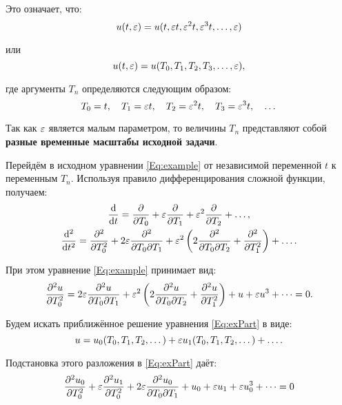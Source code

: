 Это означает, что:
\begin{equation*}
    u(t, \varepsilon) = u(t, \varepsilon t, \varepsilon^2 t, \varepsilon^3 t, \dots, \varepsilon) 
\end{equation*}

или
\begin{equation*}
    u(t, \varepsilon) = u(T_0, T_1, T_2, T_3, \dots, \varepsilon),
\end{equation*}

где аргументы $T_n$ определяются следующим образом:
\begin{equation*}
    T_0 = t, \quad T_1 = \varepsilon t, \quad T_2 = \varepsilon^2 t,
    \quad T_3 = \varepsilon^3 t, \quad \dots
\end{equation*}

Так как $\varepsilon$ является малым параметром,
то величины $T_n$ представляют собой
\textbf{разные временные масштабы исходной задачи}.

Перейдём в исходном уравнении \eqref{Eq:example}
от независимой переменной $t$ к переменным $T_n$.
Используя правило дифференцирования сложной функции, получаем:
\begin{equation*}
    \begin{gathered}
        \dv{}{t} = \pdv{}{T_0} + \varepsilon \pdv{}{T_1} +
        \varepsilon^2 \pdv{}{T_2} + \dots, \\
        \dv[2]{}{t} = \pdv[2]{}{T_0} +
        2 \varepsilon \pdv{}{T_0}{T_1} +
        \varepsilon^2 \left( 2 \pdv{}{T_0}{T_2} + \pdv[2]{T_1}\right) + \dots. 
    \end{gathered}
\end{equation*}

При этом уравнение \eqref{Eq:example} принимает вид:
\begin{equation} \label{Eq:exPart}
    \pdv[2]{u}{T_0} = 2 \varepsilon \pdv{u}{T_0}{T_1} +
    \varepsilon^2 \left( 2 \pdv{u}{T_0}{T_2} + \pdv[2]{u}{T_1} \right) +
    u + \varepsilon u^3 + \dots = 0.
\end{equation}

Будем искать приближённое решение уравнения \eqref{Eq:exPart} в виде:
\begin{equation} \label{Eq:insertDecomp}
    u = u_0(T_0, T_1, T_2, \dots) +
    \varepsilon u_1(T_0, T_1, T_2, \dots) + \dots.
\end{equation}

Подстановка этого разложения в \eqref{Eq:exPart} даёт:
\begin{equation*}
    \pdv[2]{u_0}{T_0} + \varepsilon \pdv[2]{u_1}{T_0} +
    2 \varepsilon \pdv{u_0}{T_0}{T_1} + u_0 +
    \varepsilon u_1 + \varepsilon u_0^3 + \dots = 0
\end{equation*}


